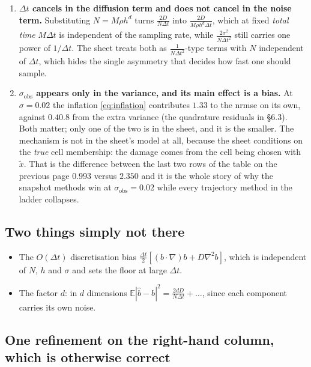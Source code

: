 \documentclass[11pt,a4paper]{article}
\newcommand{\dt}{\Delta t}
\newcommand{\E}{\mathbb{E}}
\begin{document}
\begin{enumerate}[leftmargin=1.5em,itemsep=0.45em]
\item \textbf{$\dt$ cancels in the diffusion term and does not cancel in the noise term.}
Substituting $N=M\rho h^{d}$ turns $\frac{2D}{N\dt}$ into $\frac{2D}{M\rho h^{d}\dt}$,
which at fixed \emph{total time} $M\dt$ is independent of the sampling rate, while
$\frac{2\sigma^{2}}{N\dt^{2}}$ still carries one power of $1/\dt$. The sheet treats both
as $\frac{1}{N\dt^{2}}$-type terms with $N$ independent of $\dt$, which hides the single
asymmetry that decides how fast one should sample.

\item \textbf{$\sigma_{\mathrm{obs}}$ appears only in the variance, and its main effect
is a bias.} At $\sigma=0.02$ the inflation \eqref{eq:inflation} contributes $1.33$ to the
nrmse on its own, against $0.4$\textendash$0.8$ from the extra variance (the quadrature
residuals in \S6.3). Both matter; only one of the two is in the sheet, and it is the
smaller. The mechanism is not in
the sheet's model at all, because the sheet conditions on the \emph{true} cell membership:
the damage comes from the cell being chosen with $\tilde x$. That is the difference
between the last two rows of the table on the previous page \textemdash{} $0.993$ versus
$2.350$ \textemdash{} and it is the whole story of why the snapshot methods win at
$\sigma_{\mathrm{obs}}=0.02$ while every trajectory method in the ladder collapses.

\end{enumerate}

\subsection*{Two things simply not there}

\begin{itemize}[leftmargin=1.5em,itemsep=0.25em]
\item The $O(\dt)$ discretisation bias $\frac{\dt}{2}[(b\!\cdot\!\nabla)b+D\nabla^{2}b]$,
      which is independent of $N$, $h$ and $\sigma$ and sets the floor at large $\dt$.
\item The factor $d$: in $d$ dimensions $\E|\hat b-b|^{2}=\frac{2dD}{N\dt}+\dots$,
      since each component carries its own noise.
\end{itemize}

\subsection*{One refinement on the right-hand column, which is otherwise correct}
\end{document}

